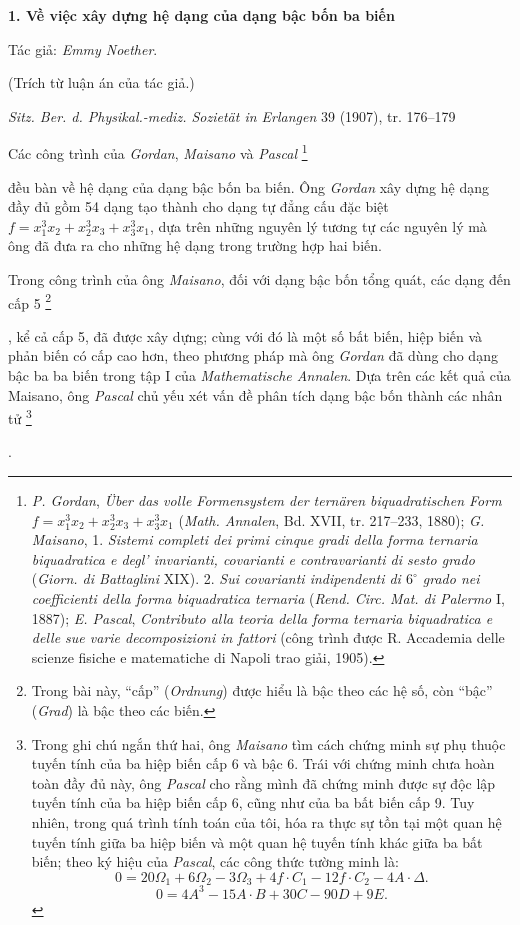 \documentclass[11pt]{article}
\providecommand{\srcfn}[2]{%
  \begingroup
  \renewcommand{\thefootnote}{#1}%
  \footnote{#2}%
  \addtocounter{footnote}{-1}%
  \endgroup}
\providecommand{\srcspaced}[1]{\emph{#1}}
\begin{document}
\setcounter{footnote}{0}

\begin{center}
{\Large\bfseries 1. Về việc xây dựng hệ dạng của dạng bậc bốn ba biến}\par
\vspace{1.2em}
Tác giả: \srcspaced{Emmy Noether}.\par
\vspace{0.8em}
(Trích từ luận án của tác giả.)\par
\vspace{1.2em}
\emph{Sitz. Ber. d. Physikal.-mediz. Sozietät in Erlangen} 39 (1907), tr. 176--179
\end{center}

Các công trình của \srcspaced{Gordan}, \srcspaced{Maisano} và \srcspaced{Pascal}\srcfn{1)}{\srcspaced{P. Gordan}, \emph{Über das volle Formensystem der ternären biquadratischen Form} $f=x_1^3x_2+x_2^3x_3+x_3^3x_1$ (\emph{Math. Annalen}, Bd. XVII, tr. 217--233, 1880); \srcspaced{G. Maisano}, 1. \emph{Sistemi completi dei primi cinque gradi della forma ternaria biquadratica e degl' invarianti, covarianti e contravarianti di sesto grado} (\emph{Giorn. di Battaglini} XIX). 2. \emph{Sui covarianti indipendenti di $6^\circ$ grado nei coefficienti della forma biquadratica ternaria} (\emph{Rend. Circ. Mat. di Palermo} I, 1887); \srcspaced{E. Pascal}, \emph{Contributo alla teoria della forma ternaria biquadratica e delle sue varie decomposizioni in fattori} (công trình được R. Accademia delle scienze fisiche e matematiche di Napoli trao giải, 1905).} đều bàn về hệ dạng của dạng bậc bốn ba biến. Ông \srcspaced{Gordan} xây dựng hệ dạng đầy đủ gồm 54 dạng tạo thành cho dạng tự đẳng cấu đặc biệt $f=x_1^3x_2+x_2^3x_3+x_3^3x_1$, dựa trên những nguyên lý tương tự các nguyên lý mà ông đã đưa ra cho những hệ dạng trong trường hợp hai biến.

Trong công trình của ông \srcspaced{Maisano}, đối với dạng bậc bốn tổng quát, các dạng đến cấp 5\srcfn{2)}{Trong bài này, ``cấp'' (\emph{Ordnung}) được hiểu là bậc theo các hệ số, còn ``bậc'' (\emph{Grad}) là bậc theo các biến.}, kể cả cấp 5, đã được xây dựng; cùng với đó là một số bất biến, hiệp biến và phản biến có cấp cao hơn, theo phương pháp mà ông \srcspaced{Gordan} đã dùng cho dạng bậc ba ba biến trong tập I của \emph{Mathematische Annalen}. Dựa trên các kết quả của Maisano, ông \srcspaced{Pascal} chủ yếu xét vấn đề phân tích dạng bậc bốn thành các nhân tử\srcfn{1)}{Trong ghi chú ngắn thứ hai, ông \srcspaced{Maisano} tìm cách chứng minh sự phụ thuộc tuyến tính của ba hiệp biến cấp 6 và bậc 6. Trái với chứng minh chưa hoàn toàn đầy đủ này, ông \srcspaced{Pascal} cho rằng mình đã chứng minh được sự độc lập tuyến tính của ba hiệp biến cấp 6, cũng như của ba bất biến cấp 9. Tuy nhiên, trong quá trình tính toán của tôi, hóa ra thực sự tồn tại một quan hệ tuyến tính giữa ba hiệp biến và một quan hệ tuyến tính khác giữa ba bất biến; theo ký hiệu của \srcspaced{Pascal}, các công thức tường minh là:
\[
0=20\Omega_1+6\Omega_2-3\Omega_3+4f\cdot C_1-12f\cdot C_2-4A\cdot\Delta.
\]
\[
0=4A^3-15A\cdot B+30C-90D+9E.
\]}. 
\end{document}
